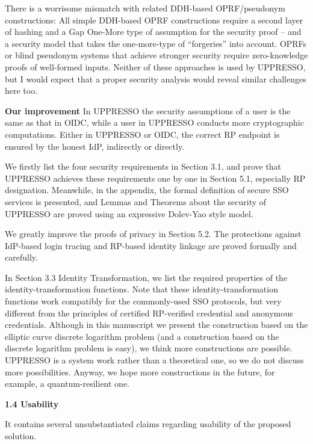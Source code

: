 \documentclass[letterpaper,onecolumn,10pt]{article}
\begin{document}
There is a worrisome mismatch with related DDH-based OPRF/pseudonym constructions:
All simple DDH-based OPRF constructions require a second layer of hashing and a Gap One-More type of assumption for the security proof -- and a security model that takes the one-more-type of ``forgeries'' into account.
OPRFs or blind pseudonym systems that achieve stronger security require zero-knowledge proofs of well-formed inputs. Neither of these approaches is used by UPPRESSO, but I would expect that a proper security analysis would reveal similar challenges here too.



\vspace{1mm}\noindent\textbf{Our improvement}
In UPPRESSO
    the security assumptions of a user is the same as that in OIDC,
        while a user in UPPRESSO conducts more cryptographic computations.
Either in UPPRESSO or OIDC,
    the correct RP endpoint is ensured by the honest IdP, indirectly or directly.

We firstly list the four security requirements in Section 3.1,
    and prove that UPPRESSO achieves these requirements one by one in Section 5.1, especially RP designation.
Meanwhile,
    in the appendix, the formal definition of secure SSO services is presented,
        and Lemmas and Theorems about the security of UPPRESSO are proved using an expressive Dolev-Yao style model.

We greatly improve the proofs of privacy in Section 5.2.
The protections against IdP-based login tracing and RP-based identity linkage are proved formally and carefully.

In Section 3.3 Identity Transformation,
    we list the required properties of the identity-transformation functions.
Note that these identity-transformation functions work compatibly for the commonly-used SSO protocols,
        but very different from the principles of certified RP-verified credential and anonymous credentials.
Although in this manuscript we present the construction based on the elliptic curve discrete logarithm problem
     (and a construction based on the discrete logarithm problem is  easy),
        we think more constructions are possible.
UPPRESSO is a system work rather than a theoretical one, so we do not discuss more possibilities.
Anyway, we hope more constructions in the future, for example, a quantum-resilient one.

\vspace{1mm}\noindent\textbf{1.4 Usability}

It contains several unsubstantiated claims regarding usability of the proposed solution.
\end{document}
